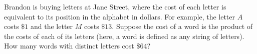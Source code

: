 Brandon is buying letters at Jane Street, where the cost of each letter is equivalent to its position in the alphabet in dollars. For example, the letter $A$ costs $\$1$ and the letter $M$ costs $\$13$. Suppose the cost of a word is the product of the costs of each of its letters (here, a word is defined as any string of letters). How many words with distinct letters cost $\$64$?
